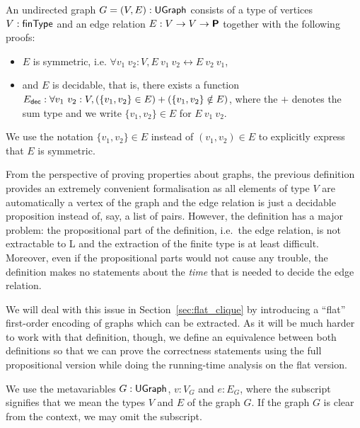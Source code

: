 \begin{definition}
  An undirected graph $G = (V, E) : \textsf{UGraph}$ consists of a type of vertices $V : \textsf{finType}$ and an edge relation $E : V \rightarrow V \rightarrow \textsf{\bfseries P}$ together with the following proofs:
  \begin{itemize}
    \item $E$ is symmetric, i.e. $\forall v_1~v_2 : V, E~v_1~v_2 \leftrightarrow E~v_2~v_1$, 
    \item and $E$ is decidable, that is, there exists a function $E_\textsf{dec} : \forall v_1~v_2 : V, (\{v_1, v_2\} \in E) + (\{v_1, v_2\} \notin E)$, where the $+$ denotes the sum type and we write $\{v_1, v_2\} \in E$ for $E~v_1~v_2$.
  \end{itemize}
  We use the notation $\{v_1, v_2\} \in E$ instead of $(v_1, v_2) \in E$ to explicitly express that $E$ is symmetric.
\end{definition}

\begin{remark}
  From the perspective of proving properties about graphs, the previous definition provides an extremely convenient formalisation as all elements of type $V$ are automatically a vertex of the graph and the edge relation is just a decidable proposition instead of, say, a list of pairs. 
  However, the definition has a major problem: the propositional part of the definition, i.e.\ the edge relation, is not extractable to L and the extraction of the finite type is at least difficult. Moreover, even if the propositional parts would not cause any trouble, the definition makes no statements about the \emph{time} that is needed to decide the edge relation. 

  We will deal with this issue in Section~\ref{sec:flat_clique} by introducing a ``flat'' first-order encoding of graphs which can be extracted. 
  As it will be much harder to work with that definition, though, we define an equivalence between both definitions so that we can prove the correctness statements using the full propositional version while doing the running-time analysis on the flat version.
\end{remark}

We use the metavariables $G : \textsf{UGraph}$, $v : V_G$ and $e : E_G$, where the subscript signifies that we mean the types $V$ and $E$ of the graph $G$. If the graph $G$ is clear from the context, we may omit the subscript. 


